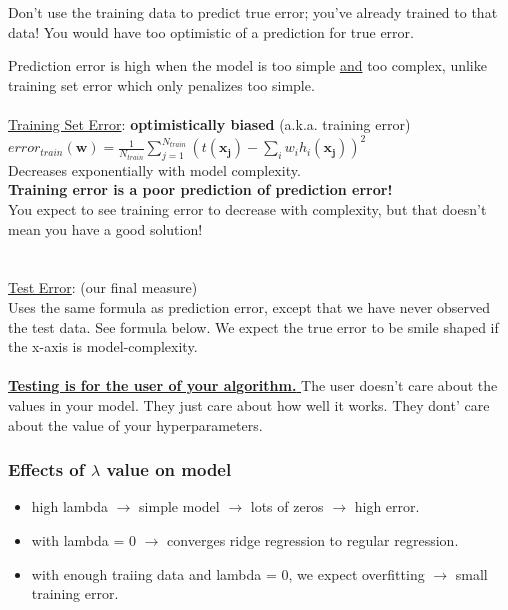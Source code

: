 Don't use the training data to predict true error; you've already trained to that data!  You would have too optimistic of a prediction for true error. 

Prediction error is high when the model is too simple \underline{and} too complex, unlike training set error which only penalizes too simple.  \hfill \\
\hfill \\

\underline{Training Set Error}:  \textbf{optimistically biased}  (a.k.a. training error) \hfill \\
$\displaystyle  error_{train}(\bm{w}) = \frac{1}{N_{train}} \sum_{j=1}^{N_{train}}(t(\bm{x_j})-\sum_{i} w_i h_i(\bm{x_j}))^2$ \hfill \\
Decreases exponentially with model complexity.   \hfill \\
\textbf{Training error is a poor prediction of prediction error!} \hfill \\
You expect to see training error to decrease with complexity, but that doesn't mean you have a good solution!  \hfill \\
\hfill \\  \hfill \\


\underline{Test Error}: (our final measure)  \hfill \\
Uses the same formula as prediction error, except that we have never observed the test data.  See formula below. 
We expect the true error to be smile shaped if the x-axis is model-complexity. 
\hfill \\ \hfill \\

\underline{\textbf{Testing is for the user of your algorithm. }}
The user doesn't care about the values in your model.  They just care about how well it works.  
 They dont' care about the value of your hyperparameters. 


\subsubsection{Effects of $\lambda$ value on model}
 \begin{itemize}
 	\item high lambda $\rightarrow$ simple model $\rightarrow$ lots of zeros $\rightarrow$ high error. 
	\item with lambda = 0 $\rightarrow$ converges ridge regression to regular regression. 
	\item with enough traiing data and lambda = 0, we expect overfitting $\rightarrow$ small training error. 
\end{itemize}


